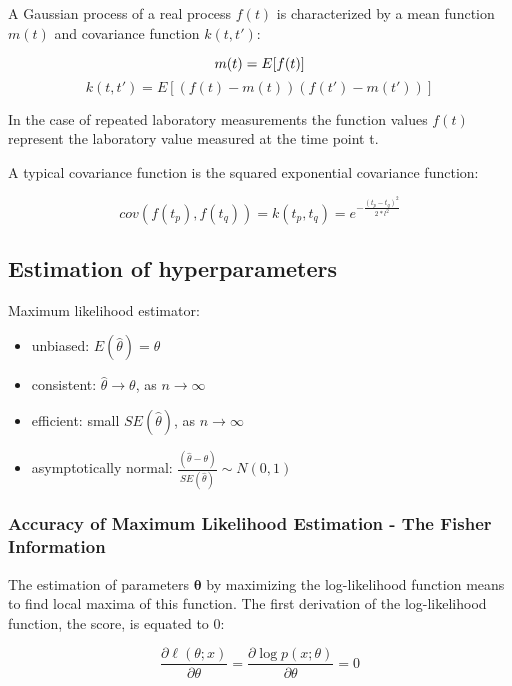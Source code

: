 \documentclass[12pt]{article}
\begin{document}
	A Gaussian process of a real process $f(t)$ is characterized by a mean function $m(t)$ and covariance function $k(t,t')$:
	
	\begin{displaymath}
	m(t) = E[f(t)]\\
	\end{displaymath}
	\begin{displaymath}
	k(t,t') = E[(f(t)-m(t)) (f(t')-m(t'))]
	\end{displaymath}   
	
	In the case of repeated laboratory measurements the function values $f(t)$ represent the laboratory value measured at the time point t.
	   
	A typical covariance function is the squared exponential covariance function:
	
	\begin{displaymath}
	cov( f(t_{p} ), f(t_{q} )) = 
	k( t_{p} , t_{q} ) = 
	e^{-\frac{(t_{p}-t_{q})^2}{2*l^2}}
	\end{displaymath}
	
	
    \subsection{Estimation of hyperparameters}
	Maximum likelihood estimator: 
	\begin{itemize}
		\item unbiased: $E(\hat{\theta}) = \theta$ 
		\item consistent: $\hat{\theta} \rightarrow \theta$, as $n \rightarrow \infty$
		\item efficient: small $SE(\hat{\theta})$, as $n \rightarrow \infty$
		\item asymptotically normal: $\frac{(\hat{\theta}-\theta)}{SE(\hat{\theta})} \sim N(0,1)$
	\end{itemize}
	\subsubsection{Accuracy of Maximum Likelihood Estimation - The Fisher Information}
	The estimation of parameters $\bm{\theta}$ by maximizing the log-likelihood function means to find local maxima of this function. 
	The first derivation of the log-likelihood function, the score, is equated to 0:
	
	\begin{displaymath}
	\frac{\partial \ell (\theta;x)}{\partial \theta}=\frac{\partial \log p(x;\theta)}{\partial \theta} = 0
	\end{displaymath}
	
\end{document}
